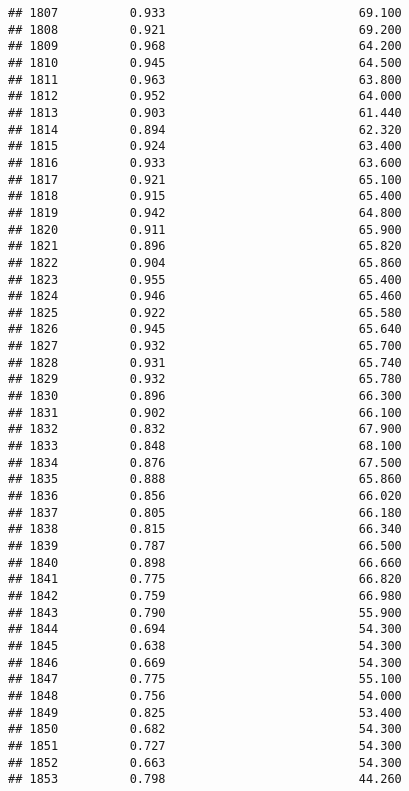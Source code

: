 \documentclass[
]{article}
\begin{document}
\begin{verbatim}
## 1807          0.933                           69.100
## 1808          0.921                           69.200
## 1809          0.968                           64.200
## 1810          0.945                           64.500
## 1811          0.963                           63.800
## 1812          0.952                           64.000
## 1813          0.903                           61.440
## 1814          0.894                           62.320
## 1815          0.924                           63.400
## 1816          0.933                           63.600
## 1817          0.921                           65.100
## 1818          0.915                           65.400
## 1819          0.942                           64.800
## 1820          0.911                           65.900
## 1821          0.896                           65.820
## 1822          0.904                           65.860
## 1823          0.955                           65.400
## 1824          0.946                           65.460
## 1825          0.922                           65.580
## 1826          0.945                           65.640
## 1827          0.932                           65.700
## 1828          0.931                           65.740
## 1829          0.932                           65.780
## 1830          0.896                           66.300
## 1831          0.902                           66.100
## 1832          0.832                           67.900
## 1833          0.848                           68.100
## 1834          0.876                           67.500
## 1835          0.888                           65.860
## 1836          0.856                           66.020
## 1837          0.805                           66.180
## 1838          0.815                           66.340
## 1839          0.787                           66.500
## 1840          0.898                           66.660
## 1841          0.775                           66.820
## 1842          0.759                           66.980
## 1843          0.790                           55.900
## 1844          0.694                           54.300
## 1845          0.638                           54.300
## 1846          0.669                           54.300
## 1847          0.775                           55.100
## 1848          0.756                           54.000
## 1849          0.825                           53.400
## 1850          0.682                           54.300
## 1851          0.727                           54.300
## 1852          0.663                           54.300
## 1853          0.798                           44.260

\end{verbatim}
\end{document}
